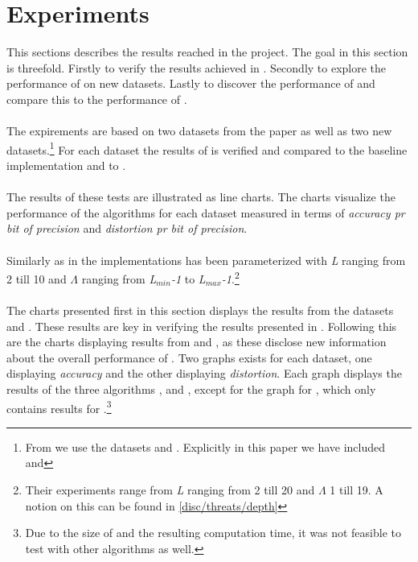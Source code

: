 \section{Experiments}
\label{results}
This sections describes the results reached in the project. The goal in this section is threefold. Firstly to verify the results achieved in \cite{wagner17}. Secondly to explore the performance of \qs{} on new datasets. Lastly to discover the performance of \qsr{} and compare this to the performance of \qs{}. 
\\
\\
The expirements are based on two datasets from the paper as well as two new datasets.\footnote{From \cite{wagner17} we use the datasets \sift{} and \mnist{}. Explicitly in this paper we have included \clust{} and \gist{}} For each dataset the results of \qs{} is verified and compared to the baseline implementation \gr{} and to \qsr{}. 
\\
\\
The results of these tests are illustrated as line charts. The charts visualize the performance of the algorithms for each dataset measured in terms of \textit{accuracy pr bit of precision} and \textit{distortion pr bit of precision}. 
\\
\\
Similarly as in \cite{wagner17} the \qs{} implementations has been parameterized with \textit{L} ranging from 2 till 10 and $\Lambda$ ranging from \textit{L$_{min}$-1} to \textit{L$_{max}$-1}.\footnote{Their experiments range from \textit{L} ranging from 2 till 20 and $\Lambda$ 1 till 19. A notion on this can be found in \ref{disc/threats/depth}} 
\\
\\
The charts presented first in this section displays the results from the datasets \sift{} and \mnist{}. These results are key in verifying the results presented in \cite{wagner17}. Following this are the charts displaying results from \clust{} and \gist{}, as these disclose new information about the overall performance of \qs{}. Two graphs exists for each dataset, one displaying \textit{accuracy} and the other displaying \textit{distortion}. Each graph displays the results of the three algorithms \qs{}, \qsr{} and \grid{}, except for the graph for \gist{}, which only contains results for \qs{}.\footnote{Due to the size of \gist{} and the resulting computation time, it was not feasible to test with other algorithms as well. }

